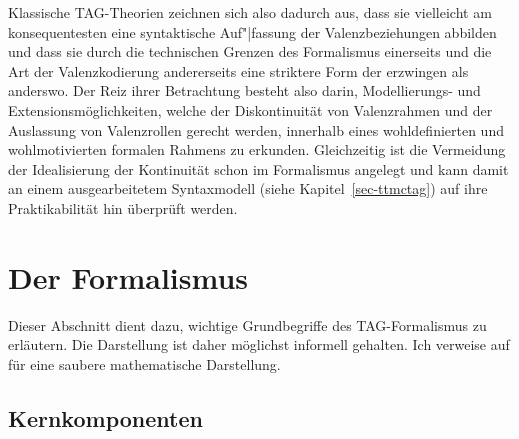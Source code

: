 % 
Klassische TAG-Theorien zeichnen sich also dadurch aus, dass sie vielleicht am konsequentesten eine syntaktische Auf"|fassung der Valenzbeziehungen abbilden und dass sie durch die technischen Grenzen des Formalismus einerseits und die Art der Valenzkodierung andererseits eine striktere Form der  erzwingen als anderswo. Der Reiz ihrer Betrachtung besteht also darin, Modellierungs- und Extensionsmöglichkeiten, welche der Diskontinuität von Valenzrahmen und der Auslassung von Valenzrollen gerecht werden, innerhalb eines wohldefinierten und wohlmotivierten formalen Rahmens zu erkunden. Gleichzeitig ist die Vermeidung der Idealisierung der Kontinuität schon im Formalismus angelegt und kann damit an einem ausgearbeitetem Syntaxmodell (siehe Kapitel~\ref{sec-ttmctag}) auf ihre Praktikabilität hin überprüft werden.  


\section{Der Formalismus}\label{sec-tag-formalismus}

Dieser Abschnitt dient dazu, wichtige Grundbegriffe des TAG-Formalismus zu erläutern. Die Darstellung ist daher möglichst informell gehalten. Ich verweise auf \cite{Kallmeyer:09} für eine saubere mathematische Darstellung.

\subsection{Kernkomponenten} 

